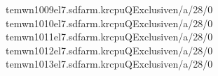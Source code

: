 \documentclass[a4paper,10pt,english]{sphinxmanual}
\begin{document}
\begin{sphinxVerbatim}[commandchars=\\\{\}]
tem\PYGZhy{}wn1009\PYGZhy{}el7.sdfarm.krcpuQExclusiven/a/28/0\PYG{o}{[}\PYG{c+c1}{\PYGZsh{}\PYGZsh{}\PYGZsh{}\PYGZsh{}\PYGZsh{}\PYGZsh{}\PYGZsh{}\PYGZsh{}\PYGZsh{}\PYGZsh{}\PYGZsh{}\PYGZsh{}\PYGZsh{}\PYGZsh{}\PYGZsh{}\PYGZsh{}\PYGZsh{}\PYGZsh{}\PYGZsh{}\PYGZsh{}\PYGZsh{}\PYGZsh{}\PYGZsh{}\PYGZsh{}\PYGZsh{}\PYGZsh{}\PYGZsh{}\PYGZsh{}]}
tem\PYGZhy{}wn1010\PYGZhy{}el7.sdfarm.krcpuQExclusiven/a/28/0\PYG{o}{[}\PYG{c+c1}{\PYGZsh{}\PYGZsh{}\PYGZsh{}\PYGZsh{}\PYGZsh{}\PYGZsh{}\PYGZsh{}\PYGZsh{}\PYGZsh{}\PYGZsh{}\PYGZsh{}\PYGZsh{}\PYGZsh{}\PYGZsh{}\PYGZsh{}\PYGZsh{}\PYGZsh{}\PYGZsh{}\PYGZsh{}\PYGZsh{}\PYGZsh{}\PYGZsh{}\PYGZsh{}\PYGZsh{}\PYGZsh{}\PYGZsh{}\PYGZsh{}\PYGZsh{}]}
tem\PYGZhy{}wn1011\PYGZhy{}el7.sdfarm.krcpuQExclusiven/a/28/0\PYG{o}{[}\PYG{c+c1}{\PYGZsh{}\PYGZsh{}\PYGZsh{}\PYGZsh{}\PYGZsh{}\PYGZsh{}\PYGZsh{}\PYGZsh{}\PYGZsh{}\PYGZsh{}\PYGZsh{}\PYGZsh{}\PYGZsh{}\PYGZsh{}\PYGZsh{}\PYGZsh{}\PYGZsh{}\PYGZsh{}\PYGZsh{}\PYGZsh{}\PYGZsh{}\PYGZsh{}\PYGZsh{}\PYGZsh{}\PYGZsh{}\PYGZsh{}\PYGZsh{}\PYGZsh{}]}
tem\PYGZhy{}wn1012\PYGZhy{}el7.sdfarm.krcpuQExclusiven/a/28/0\PYG{o}{[}\PYG{c+c1}{\PYGZsh{}\PYGZsh{}\PYGZsh{}\PYGZsh{}\PYGZsh{}\PYGZsh{}\PYGZsh{}\PYGZsh{}\PYGZsh{}\PYGZsh{}\PYGZsh{}\PYGZsh{}\PYGZsh{}\PYGZsh{}\PYGZsh{}\PYGZsh{}\PYGZsh{}\PYGZsh{}\PYGZsh{}\PYGZsh{}\PYGZsh{}\PYGZsh{}\PYGZsh{}\PYGZsh{}\PYGZsh{}\PYGZsh{}\PYGZsh{}\PYGZsh{}]}
tem\PYGZhy{}wn1013\PYGZhy{}el7.sdfarm.krcpuQExclusiven/a/28/0\PYG{o}{[}\PYG{c+c1}{\PYGZsh{}\PYGZsh{}\PYGZsh{}\PYGZsh{}\PYGZsh{}\PYGZsh{}\PYGZsh{}\PYGZsh{}\PYGZsh{}\PYGZsh{}\PYGZsh{}\PYGZsh{}\PYGZsh{}\PYGZsh{}\PYGZsh{}\PYGZsh{}\PYGZsh{}\PYGZsh{}\PYGZsh{}\PYGZsh{}\PYGZsh{}\PYGZsh{}\PYGZsh{}\PYGZsh{}\PYGZsh{}\PYGZsh{}\PYGZsh{}\PYGZsh{}]}
\PYGZhy{}\PYGZhy{}\PYGZhy{}\PYGZhy{}\PYGZhy{}\PYGZhy{}\PYGZhy{}\PYGZhy{}\PYGZhy{}\PYGZhy{}\PYGZhy{}\PYGZhy{}\PYGZhy{}\PYGZhy{}\PYGZhy{}\PYGZhy{}\PYGZhy{}\PYGZhy{}\PYGZhy{}\PYGZhy{}\PYGZhy{}\PYGZhy{}\PYGZhy{}\PYGZhy{}\PYGZhy{}\PYGZhy{}\PYGZhy{}\PYGZhy{}\PYGZhy{}\PYGZhy{}\PYGZhy{}\PYGZhy{}\PYGZhy{}\PYGZhy{}\PYGZhy{}\PYGZhy{}\PYGZhy{}\PYGZhy{}\PYGZhy{}\PYGZhy{}\PYGZhy{}\PYGZhy{}\PYGZhy{}\PYGZhy{}\PYGZhy{}\PYGZhy{}\PYGZhy{}\PYGZhy{}\PYGZhy{}\PYGZhy{}\PYGZhy{}\PYGZhy{}\PYGZhy{}\PYGZhy{}\PYGZhy{}\PYGZhy{}\PYGZhy{}\PYGZhy{}\PYGZhy{}\PYGZhy{}\PYGZhy{}\PYGZhy{}\PYGZhy{}\PYGZhy{}\PYGZhy{}\PYGZhy{}\PYGZhy{}\PYGZhy{}\PYGZhy{}\PYGZhy{}\PYGZhy{}\PYGZhy{}\PYGZhy{}\PYGZhy{}\PYGZhy{}\PYGZhy{}\PYGZhy{}\PYGZhy{}\PYGZhy{}\PYGZhy{}\PYGZhy{}\PYGZhy{}\PYGZhy{}\PYGZhy{}\PYGZhy{}\PYGZhy{}\PYGZhy{}\PYGZhy{}\PYGZhy{}\PYGZhy{}\PYGZhy{}\PYGZhy{}\PYGZhy{}\PYGZhy{}\PYGZhy{}\PYGZhy{}\PYGZhy{}\PYGZhy{}\PYGZhy{}\PYGZhy{}\PYGZhy{}\PYGZhy{}\PYGZhy{}\PYGZhy{}\PYGZhy{}\PYGZhy{}\PYGZhy{}\PYGZhy{}\PYGZhy{}\PYGZhy{}\PYGZhy{}\PYGZhy{}\PYGZhy{}\PYGZhy{}\PYGZhy{}\PYGZhy{}\PYGZhy{}\PYGZhy{}\PYGZhy{}\PYGZhy{}

\end{sphinxVerbatim}
\end{document}
